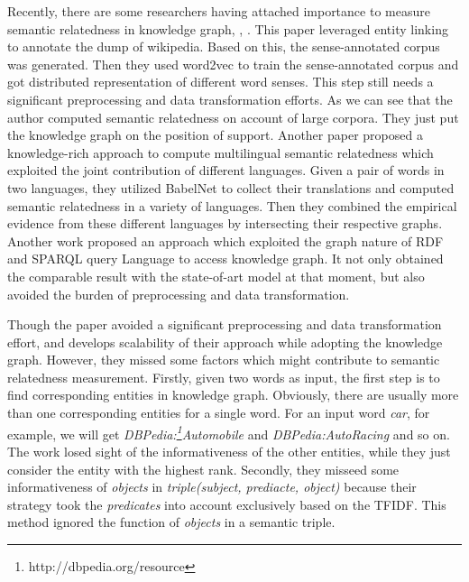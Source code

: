 Recently, there are some researchers having attached importance to measure semantic relatedness
in knowledge graph\cite{acl/IacobacciPN15}, \cite{aaai/NavigliP12}, \cite{aaai/Pirro12}. 
This paper \cite{acl/IacobacciPN15} leveraged entity linking to annotate the dump of wikipedia. Based on this,
the sense-annotated corpus was generated. Then they\cite{acl/IacobacciPN15} used word2vec to
train the sense-annotated corpus and got distributed representation of different 
word senses. This step still needs a significant preprocessing and data transformation efforts. 
As we can see that the author\cite{acl/IacobacciPN15} computed semantic relatedness on account of large corpora.
They just put the knowledge graph on the position of support.
Another paper\cite{aaai/NavigliP12} proposed a knowledge-rich approach to compute multilingual semantic
relatedness which exploited the joint contribution of different languages. Given a pair of words 
in two languages, they\cite{aaai/NavigliP12} utilized BabelNet to collect their translations and computed semantic
relatedness in a variety of languages. Then they combined the empirical evidence from these 
different languages by intersecting their respective graphs.
Another work \cite{aaai/Pirro12} proposed an approach which exploited the graph nature of RDF and SPARQL query
Language to access knowledge graph. It not only obtained the comparable
result with the state-of-art model at that moment, but also avoided the burden
of preprocessing and data transformation.

Though the paper\cite{aaai/Pirro12} avoided a significant preprocessing and data
transformation effort, and develops scalability of their approach while adopting 
the knowledge graph. However, they missed some factors which
might contribute to semantic relatedness measurement. Firstly, given two words
as input, the first step is to find corresponding entities in knowledge
graph. Obviously, there are usually more than one corresponding entities for a single word.
For an input word \emph{car}, for example, we will get \emph{DBPedia:\footnote{http://dbpedia.org/resource}Automobile} and
\emph{DBPedia:Auto\underline{\hspace{0.5em}}Racing} and so on. The work \cite{aaai/Pirro12} losed
sight of the informativeness of the other entities, while they just
consider the entity with the highest rank. Secondly, they \cite{aaai/Pirro12} misseed
some informativeness of \emph{objects} in \emph{triple(subject, prediacte, object)} because their strategy took
the \emph{predicates} into account exclusively based on the TFIDF. This
method ignored the function of \emph{objects} in a semantic triple.

